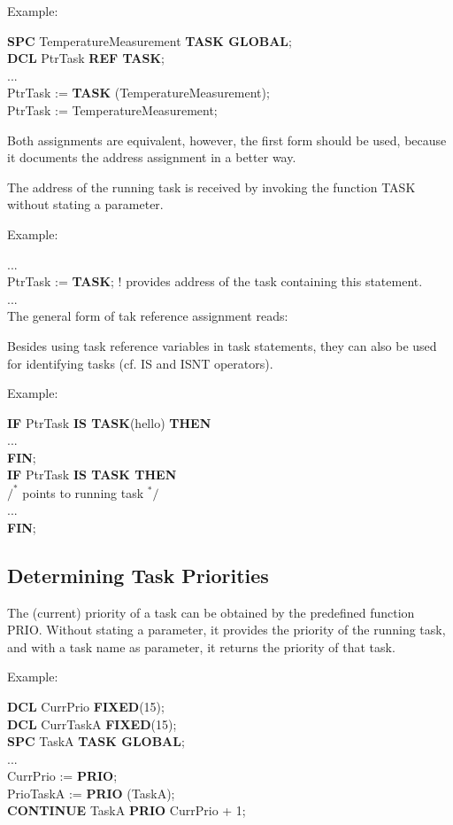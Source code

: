 Example:

{\bf SPC} TemperatureMeasurement {\bf TASK GLOBAL};\\
{\bf DCL} PtrTask {\bf REF TASK};\\
...\\
PtrTask := {\bf TASK} (TemperatureMeasurement);\\
PtrTask := TemperatureMeasurement;

Both assignments are equivalent, however, the first form should be used,
because it documents the address assignment in a better way.

The address of the running task is received by invoking the function
TASK without stating a parameter.

Example:

...\\
PtrTask := {\bf TASK}; \x ! provides address of the task containing
this statement.\\
...\\

The general form of tak reference assignment reads:



Besides using task reference variables in task statements, they can
also be used for identifying tasks (cf. IS and ISNT operators).

Example:

{\bf IF} PtrTask {\bf IS TASK}(hello) {\bf THEN}\\
\x \x ...\\
{\bf FIN};\\
{\bf IF} PtrTask {\bf IS TASK THEN}\\
\x \x $/^*$ points to running task $^*/$\\
\x \x ...\\
{\bf FIN};

\subsection{Determining Task Priorities}   %

The (current) priority of a task can be obtained by the predefined
function PRIO.
 Without stating a parameter, it provides the priority of
the running task, and with a task name as parameter, it returns the
priority of that task.

Example:

{\bf DCL} CurrPrio {\bf FIXED}(15);\\
{\bf DCL} CurrTaskA {\bf FIXED}(15);\\
{\bf SPC} TaskA {\bf TASK GLOBAL};\\
...\\
CurrPrio := {\bf PRIO};\\
PrioTaskA := {\bf PRIO} (TaskA);\\
{\bf CONTINUE} TaskA {\bf PRIO} CurrPrio + 1;

